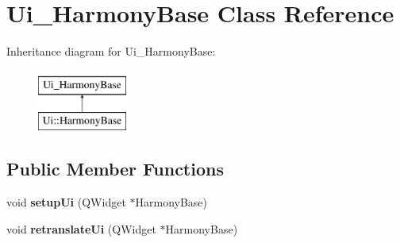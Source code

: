 \hypertarget{class_ui___harmony_base}{}\section{Ui\+\_\+\+Harmony\+Base Class Reference}
\label{class_ui___harmony_base}
Inheritance diagram for Ui\+\_\+\+Harmony\+Base\+:\begin{figure}[H]
\begin{center}
\leavevmode
\includegraphics[height=2.000000cm]{class_ui___harmony_base}
\end{center}
\end{figure}
\subsection*{Public Member Functions}
\begin{DoxyCompactItemize}
\item 
\mbox{\label{class_ui___harmony_base_afe27692d5bcf49ed44f0150d79907fb4}} 
void {\bfseries setup\+Ui} (Q\+Widget $\ast$Harmony\+Base)
\item 
\mbox{\label{class_ui___harmony_base_a7de00d9cc950e0594f999e408fca1c1b}} 
void {\bfseries retranslate\+Ui} (Q\+Widget $\ast$Harmony\+Base)
\end{DoxyCompactItemize}
